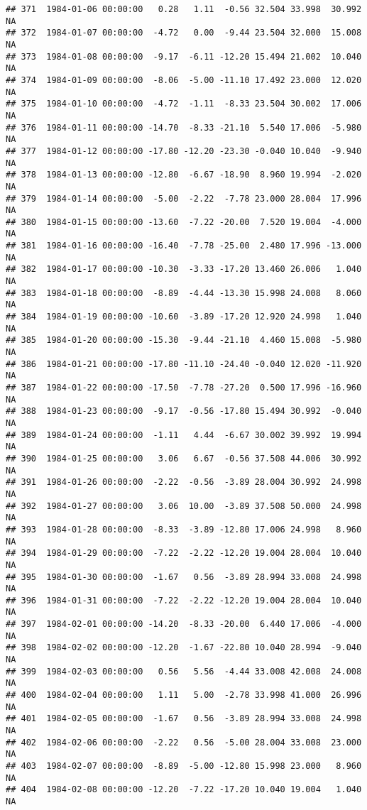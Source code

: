 \documentclass{article}\usepackage{graphicx, color}
\makeatletter
\newenvironment{kframe}{%
 \def\at@end@of@kframe{}%
 \ifinner\ifhmode%
  \def\at@end@of@kframe{\end{minipage}}%
  \begin{minipage}{\columnwidth}%
 \fi\fi%
 \def\FrameCommand##1{\hskip\@totalleftmargin \hskip-\fboxsep
 \colorbox{shadecolor}{##1}\hskip-\fboxsep
     \hskip-\linewidth \hskip-\@totalleftmargin \hskip\columnwidth}%
 \MakeFramed {\advance\hsize-\width
   \@totalleftmargin\z@ \linewidth\hsize
   \@setminipage}}%
 {\par\unskip\endMakeFramed%
 \at@end@of@kframe}
\newenvironment{knitrout}{}{} %
\makeatother
\begin{document}
\begin{knitrout}
\begin{kframe}
\begin{verbatim}
## 371  1984-01-06 00:00:00   0.28   1.11  -0.56 32.504 33.998  30.992     NA
## 372  1984-01-07 00:00:00  -4.72   0.00  -9.44 23.504 32.000  15.008     NA
## 373  1984-01-08 00:00:00  -9.17  -6.11 -12.20 15.494 21.002  10.040     NA
## 374  1984-01-09 00:00:00  -8.06  -5.00 -11.10 17.492 23.000  12.020     NA
## 375  1984-01-10 00:00:00  -4.72  -1.11  -8.33 23.504 30.002  17.006     NA
## 376  1984-01-11 00:00:00 -14.70  -8.33 -21.10  5.540 17.006  -5.980     NA
## 377  1984-01-12 00:00:00 -17.80 -12.20 -23.30 -0.040 10.040  -9.940     NA
## 378  1984-01-13 00:00:00 -12.80  -6.67 -18.90  8.960 19.994  -2.020     NA
## 379  1984-01-14 00:00:00  -5.00  -2.22  -7.78 23.000 28.004  17.996     NA
## 380  1984-01-15 00:00:00 -13.60  -7.22 -20.00  7.520 19.004  -4.000     NA
## 381  1984-01-16 00:00:00 -16.40  -7.78 -25.00  2.480 17.996 -13.000     NA
## 382  1984-01-17 00:00:00 -10.30  -3.33 -17.20 13.460 26.006   1.040     NA
## 383  1984-01-18 00:00:00  -8.89  -4.44 -13.30 15.998 24.008   8.060     NA
## 384  1984-01-19 00:00:00 -10.60  -3.89 -17.20 12.920 24.998   1.040     NA
## 385  1984-01-20 00:00:00 -15.30  -9.44 -21.10  4.460 15.008  -5.980     NA
## 386  1984-01-21 00:00:00 -17.80 -11.10 -24.40 -0.040 12.020 -11.920     NA
## 387  1984-01-22 00:00:00 -17.50  -7.78 -27.20  0.500 17.996 -16.960     NA
## 388  1984-01-23 00:00:00  -9.17  -0.56 -17.80 15.494 30.992  -0.040     NA
## 389  1984-01-24 00:00:00  -1.11   4.44  -6.67 30.002 39.992  19.994     NA
## 390  1984-01-25 00:00:00   3.06   6.67  -0.56 37.508 44.006  30.992     NA
## 391  1984-01-26 00:00:00  -2.22  -0.56  -3.89 28.004 30.992  24.998     NA
## 392  1984-01-27 00:00:00   3.06  10.00  -3.89 37.508 50.000  24.998     NA
## 393  1984-01-28 00:00:00  -8.33  -3.89 -12.80 17.006 24.998   8.960     NA
## 394  1984-01-29 00:00:00  -7.22  -2.22 -12.20 19.004 28.004  10.040     NA
## 395  1984-01-30 00:00:00  -1.67   0.56  -3.89 28.994 33.008  24.998     NA
## 396  1984-01-31 00:00:00  -7.22  -2.22 -12.20 19.004 28.004  10.040     NA
## 397  1984-02-01 00:00:00 -14.20  -8.33 -20.00  6.440 17.006  -4.000     NA
## 398  1984-02-02 00:00:00 -12.20  -1.67 -22.80 10.040 28.994  -9.040     NA
## 399  1984-02-03 00:00:00   0.56   5.56  -4.44 33.008 42.008  24.008     NA
## 400  1984-02-04 00:00:00   1.11   5.00  -2.78 33.998 41.000  26.996     NA
## 401  1984-02-05 00:00:00  -1.67   0.56  -3.89 28.994 33.008  24.998     NA
## 402  1984-02-06 00:00:00  -2.22   0.56  -5.00 28.004 33.008  23.000     NA
## 403  1984-02-07 00:00:00  -8.89  -5.00 -12.80 15.998 23.000   8.960     NA
## 404  1984-02-08 00:00:00 -12.20  -7.22 -17.20 10.040 19.004   1.040     NA

\end{verbatim}
\end{kframe}
\end{knitrout}
\end{document}
